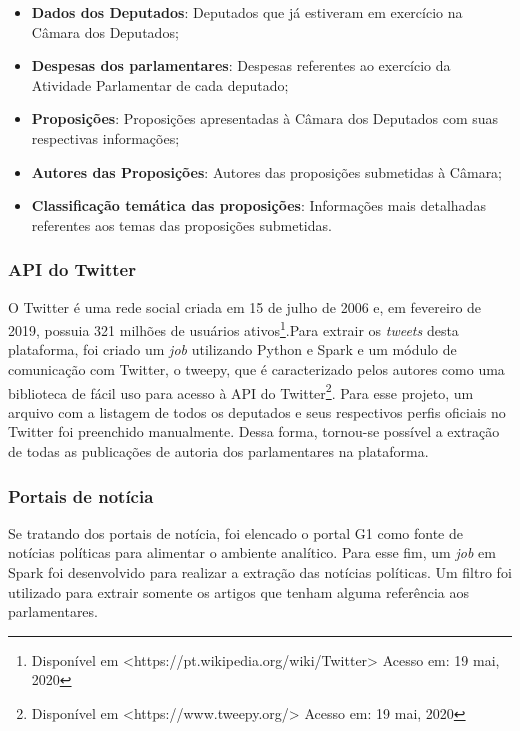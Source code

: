 \begin{itemize}
\item \textbf{Dados dos Deputados}: Deputados que já estiveram em exercício na Câmara dos Deputados;
\item \textbf{Despesas dos parlamentares}: Despesas referentes ao exercício da Atividade Parlamentar de cada deputado;
\item \textbf{Proposições}: Proposições apresentadas à Câmara dos Deputados com suas respectivas informações;
\item \textbf{Autores das Proposições}: Autores das proposições submetidas à Câmara;
\item \textbf{Classificação temática das proposições}: Informações mais detalhadas referentes aos temas das proposições submetidas.
\end{itemize}

\subsubsection{API do Twitter} O Twitter é uma rede social criada em 15 de julho de 2006 e, em fevereiro de 2019, possuia 321 milhões de usuários ativos\footnote{Disponível em <https://pt.wikipedia.org/wiki/Twitter> Acesso em: 19 mai, 2020}.Para extrair os \textit{tweets} desta plataforma, foi criado um \textit{job} utilizando Python e Spark e um módulo de comunicação com Twitter, o tweepy, que é caracterizado pelos autores como uma biblioteca de fácil uso para acesso à API do Twitter\footnote{Disponível em <https://www.tweepy.org/> Acesso em: 19 mai, 2020}. Para esse projeto, um arquivo com a listagem de todos os deputados e seus respectivos perfis oficiais no Twitter foi preenchido manualmente. Dessa forma, tornou-se possível a extração de todas as publicações de autoria dos parlamentares na plataforma.

\subsubsection{Portais de notícia} Se tratando dos portais de notícia, foi elencado o portal G1 como fonte de notícias políticas para alimentar o ambiente analítico. Para esse fim, um \textit{job} em Spark foi desenvolvido para realizar a extração das notícias políticas. Um filtro foi utilizado para extrair somente os artigos que tenham alguma referência aos parlamentares. 

